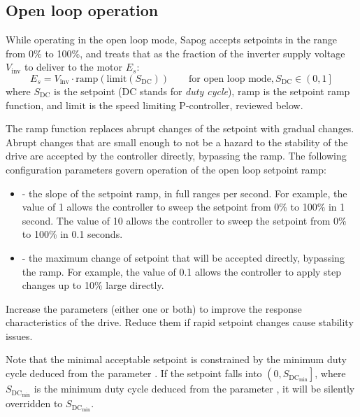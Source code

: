 \documentclass{zubaxdoc}
\begin{document}
	\subsection{Open loop operation}\label{sec:open_loop}
	
	While operating in the open loop mode, Sapog accepts setpoints in the range from 0\% to 100\%,
	and treats that as the fraction of the inverter supply voltage $V_\text{inv}$ to
	deliver to the motor $E_s$:
	\begin{equation}
		E_s = V_\text{inv}\cdot{}\mathrm{ramp}\left(\mathrm{limit}\left(S_\text{DC}\right)\right)
		\qquad\text{for open loop mode}, S_\text{DC} \in \left(0, 1\right]
	\end{equation}
	where $S_\text{DC}$ is the setpoint (DC stands for \emph{duty cycle}),
	$\mathrm{ramp}$ is the setpoint ramp function,
	and $\mathrm{limit}$ is the speed limiting P-controller, reviewed below.
	
	The ramp function replaces abrupt changes of the setpoint with gradual changes.
	Abrupt changes that are small enough to not be a hazard to the stability of the drive are
	accepted by the controller directly, bypassing the ramp.
	The following configuration parameters govern operation of the open loop setpoint ramp:
	
	\begin{itemize}
		\item {} - the slope of the setpoint ramp, in full ranges per second.
		For example, the value of 1 allows the controller to sweep the setpoint from 0\% to 100\% in 1 second.
		The value of 10 allows the controller to sweep the setpoint from 0\% to 100\% in 0.1 seconds.
		\item {} - the maximum change of setpoint that will be accepted directly,
		bypassing the ramp.
		For example, the value of 0.1 allows the controller to apply step changes up to 10\% large directly.
	\end{itemize}
	
	Increase the parameters (either one or both) to improve the response characteristics of the drive.
	Reduce them if rapid setpoint changes cause stability issues.
	
	Note that the minimal acceptable setpoint is constrained by the minimum duty cycle deduced from
	the parameter .
	If the setpoint falls into $\left(0, S_{\text{DC}_\text{min}}\right]$,
	where $S_{\text{DC}_\text{min}}$ is the minimum
	duty cycle deduced from the parameter ,
	it will be silently overridden to $S_{\text{DC}_\text{min}}$.
	
\end{document}
